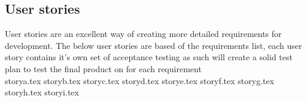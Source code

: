 \subsection{User stories}
User stories are an excellent way of creating more detailed requirements for development. The below user stories are based of the requirements list, each user story contains it's own set of acceptance testing as such will create a solid test plan to test the final product on for each requirement\\

{storya.tex}
{storyb.tex}
{storyc.tex}
{storyd.tex}
{storye.tex}
{storyf.tex}
{storyg.tex}
{storyh.tex}
{storyi.tex}